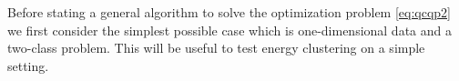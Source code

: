 \documentclass[aps,preprint,nofootinbib,floatfix]{revtex4-1}
\begin{document}


Before stating a general algorithm to solve the optimization problem
\eqref{eq:qcqp2}
we first consider the simplest possible case which
is one-dimensional data and a two-class problem. This will be useful to test
energy clustering on a simple setting.
\end{document}
